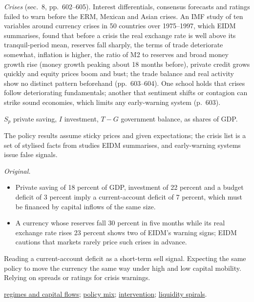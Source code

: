 \begin{qfdefinition}
\emph{Crises} (sec.~8, pp.~602--605). Interest differentials, consensus forecasts and ratings failed to warn before the ERM, Mexican and Asian crises. An IMF study of ten variables around currency crises in 50 countries over 1975--1997, which EIDM summarises, found that before a crisis the real exchange rate is well above its tranquil-period mean, reserves fall sharply, the terms of trade deteriorate somewhat, inflation is higher, the ratio of M2 to reserves and broad money growth rise (money growth peaking about 18 months before), private credit grows quickly and equity prices boom and bust; the trade balance and real activity show no distinct pattern beforehand (pp.~603--604). One school holds that crises follow deteriorating fundamentals; another that sentiment shifts or contagion can strike sound economies, which limits any early-warning system (p.~603).

 $S_p$ private saving, $I$ investment, $T-G$ government balance, as shares of GDP.

 The policy results assume sticky prices and given expectations; the crisis list is a set of stylised facts from studies EIDM summarises, and early-warning systems issue false signals.

 \emph{Original.}
\begin{itemize}
\item Private saving of 18 percent of GDP, investment of 22 percent and a budget deficit of 3 percent imply a current-account deficit of 7 percent, which must be financed by capital inflows of the same size.
\item A currency whose reserves fall 30 percent in five months while its real exchange rate rises 23 percent shows two of EIDM's warning signs; EIDM cautions that markets rarely price such crises in advance.
\end{itemize}

 Reading a current-account deficit as a short-term sell signal. Expecting the same policy to move the currency the same way under high and low capital mobility. Relying on spreads or ratings for crisis warnings.

 \hyperref[def:exchange-rate-regimes-capital-flows]{regimes and capital flows}; \hyperref[meth:monetary-fiscal-policy-mix]{policy mix}; \hyperref[def:currency-regimes-intervention]{intervention}; \hyperref[mod:margin-liquidity-spiral]{liquidity spirals}.

\end{qfdefinition}
